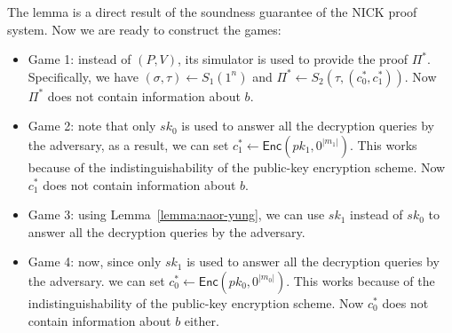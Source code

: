 The lemma is a direct result of the soundness guarantee of the NICK proof system. Now we are ready to construct the games:
\begin{itemize}
    \item Game 1: instead of $(P, V)$, its simulator is used to provide the proof $\Pi^*$. Specifically, we  have $(\sigma, \tau) \gets S_1(1^n)$ and $\Pi^* \gets S_2(\tau, (c_0^*, c_1^*))$. Now $\Pi^*$ does not contain information about $b$.
    \item Game 2: note that only $sk_0$ is used to answer all the decryption queries by the adversary, as a result, we can set $c_1^*\gets \mathsf{Enc}(pk_1, 0^{|m_1|})$. This works because of the indistinguishability of the public-key encryption scheme. Now $c_1^*$ does not contain information about $b$.
    \item Game 3: using Lemma~\ref{lemma:naor-yung}, we can use $sk_1$ instead of $sk_0$ to answer all the decryption queries by the adversary.
    \item Game 4: now, since only $sk_1$ is used to answer all the decryption queries by the adversary. we can set $c_0^*\gets \mathsf{Enc}(pk_0, 0^{|m_0|})$. This works because of the indistinguishability of the public-key encryption scheme. Now $c_0^*$ does not contain information about $b$ either.
\end{itemize}
